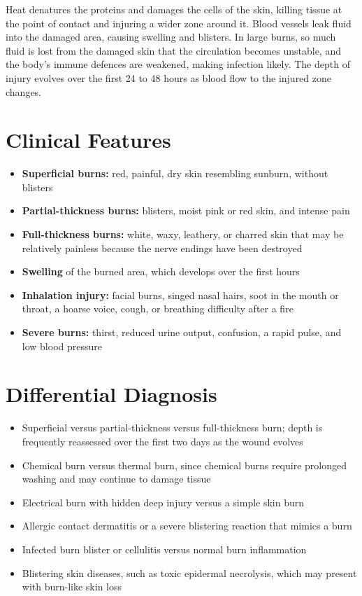 Heat denatures the proteins and damages the cells of the skin, killing tissue at the point of contact and injuring a wider zone around it. Blood vessels leak fluid into the damaged area, causing swelling and blisters. In large burns, so much fluid is lost from the damaged skin that the circulation becomes unstable, and the body's immune defences are weakened, making infection likely. The depth of injury evolves over the first 24 to 48 hours as blood flow to the injured zone changes.

\section*{Clinical Features}
\begin{itemize}
    \item \textbf{Superficial burns:} red, painful, dry skin resembling sunburn, without blisters
    \item \textbf{Partial-thickness burns:} blisters, moist pink or red skin, and intense pain
    \item \textbf{Full-thickness burns:} white, waxy, leathery, or charred skin that may be relatively painless because the nerve endings have been destroyed
    \item \textbf{Swelling} of the burned area, which develops over the first hours
    \item \textbf{Inhalation injury:} facial burns, singed nasal hairs, soot in the mouth or throat, a hoarse voice, cough, or breathing difficulty after a fire
    \item \textbf{Severe burns:} thirst, reduced urine output, confusion, a rapid pulse, and low blood pressure
\end{itemize}

\section*{Differential Diagnosis}
\begin{itemize}
    \item Superficial versus partial-thickness versus full-thickness burn; depth is frequently reassessed over the first two days as the wound evolves
    \item Chemical burn versus thermal burn, since chemical burns require prolonged washing and may continue to damage tissue
    \item Electrical burn with hidden deep injury versus a simple skin burn
    \item Allergic contact dermatitis or a severe blistering reaction that mimics a burn
    \item Infected burn blister or cellulitis versus normal burn inflammation
    \item Blistering skin diseases, such as toxic epidermal necrolysis, which may present with burn-like skin loss
\end{itemize}

